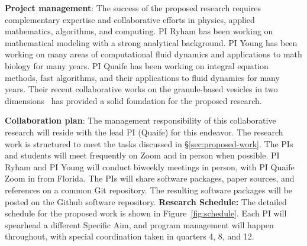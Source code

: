 \textbf{Project management}: 
%
The success of the proposed research requires complementary expertise
and collaborative efforts in physics, applied mathematics, algorithms,
and computing. PI Ryham has been working on mathematical modeling with a
strong analytical background. PI Young has been working on many areas of
computational fluid dynamics and applications to math biology for many
years. PI Quaife has been working on integral equation methods, fast
algorithms, and their applications to fluid dynamics for many years.
Their recent collaborative works on the granule-based vesicles in two
dimensions~\cite{FuQuRyYo22, fu-ryh-qua-you2022} has provided a solid
foundation for the proposed research.

\smallskip

\textbf{Collaboration plan}: 
%
The management responsibility of this collaborative research will reside
with the lead PI (Quaife) for this endeavor. The research work is
structured to meet the tasks discussed in \S\ref{sec:proposed-work}. The
PIs and students will meet frequently on Zoom and in person when
possible. PI Ryham and PI Young will conduct biweekly meetings in
person, with PI Quaife Zoom in from Florida. The PIs will share software
packages, paper sources, and references on a common \textsf{Git}
repository. The resulting software packages will be posted on the
\textsf{Github} software repository.
%
%
\textbf{Research Schedule:} The detailed schedule for the proposed work
is shown in Figure~\ref{fig:schedule}. Each PI will spearhead a
different Specific Aim, and program management will happen
throughout, with special coordination taken in quarters 4, 8, and
12.


